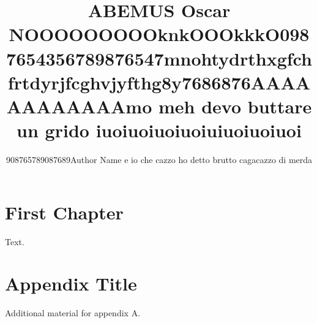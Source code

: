 \documentclass[11pt,a4paper,openright]{book}
\title{ABEMUS Oscar NOOOOOOOOOknkOOOkkkO0987654356789876547mnohtydrthxgfchfrtdyrjfcghvjyfthg8y7686876AAAAAAAAAAAAmo meh devo buttare un grido iuoiuoiuoiuoiuiuoiuoiuoi}
\author{908765789087689Author Name e io che cazzo ho detto brutto cagacazzo di merda}
\date{}
\begin{document}
\maketitle
\tableofcontents


\chapter{First Chapter}
Text. 
\cite{doe2025sample} 


\appendix
\chapter{Appendix Title}
Additional material for appendix A.





\end{document}

